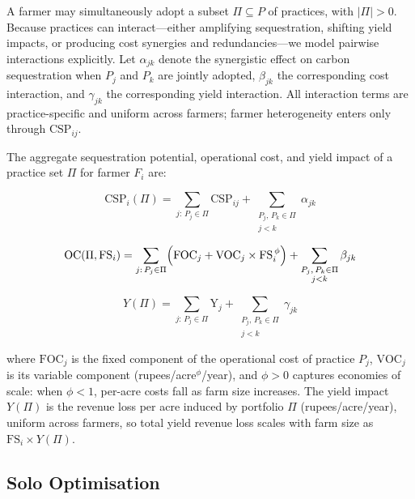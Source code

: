 \documentclass[manuscript, screen, review, anonymous]{acmart}
\begin{document}
A farmer may simultaneously adopt a subset $\Pi \subseteq P$ of practices,
with $|\Pi| > 0$. Because practices can interact---either amplifying
sequestration, shifting yield impacts, or producing cost synergies and
redundancies---we model pairwise interactions explicitly. Let $\alpha_{jk}$
denote the synergistic effect on carbon sequestration when $P_j$ and $P_k$
are jointly adopted, $\beta_{jk}$ the corresponding cost interaction, and
$\gamma_{jk}$ the corresponding yield interaction. All interaction terms are
practice-specific and uniform across farmers; farmer heterogeneity enters
only through $\text{CSP}_{ij}$.

The aggregate sequestration potential, operational cost, and yield impact of a
practice set $\Pi$ for farmer $F_i$ are:

\begin{equation}
    \text{CSP}_i(\Pi) = \sum_{j:\, P_j \in \Pi} \text{CSP}_{ij}
    + \sum_{\substack{P_j,\, P_k \in \Pi \\ j < k}} \alpha_{jk}
\end{equation}

\begin{equation}
    \text{OC}(\Pi, \text{FS}_i) = \sum_{j:\, P_j \in \Pi}
    \Bigl(\text{FOC}_j + \text{VOC}_j \times \text{FS}_i^{\,\phi}\Bigr)
    + \sum_{\substack{P_j,\, P_k \in \Pi \\ j < k}} \beta_{jk}
\end{equation}

\begin{equation}
    Y(\Pi) = \sum_{j:\, P_j \in \Pi} \text{Y}_j
    + \sum_{\substack{P_j,\, P_k \in \Pi \\ j < k}} \gamma_{jk}
\end{equation}

\noindent where $\text{FOC}_j$ is the fixed component of the operational cost
of practice $P_j$, $\text{VOC}_j$ is its variable component (rupees/acre$^\phi$/year),
and $\phi > 0$ captures economies of scale: when $\phi < 1$, per-acre costs
fall as farm size increases. The yield impact $Y(\Pi)$ is the revenue loss per
acre induced by portfolio $\Pi$ (rupees/acre/year), uniform across farmers, so
total yield revenue loss scales with farm size as $\text{FS}_i \times Y(\Pi)$.

\subsection{Solo Optimisation}
\end{document}
